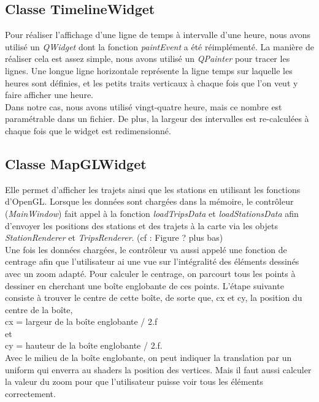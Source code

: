 \documentclass[12pt]{article}
\begin{document}
		\subsection{Classe TimelineWidget}
		Pour réaliser l’affichage d’une ligne de temps à intervalle d’une heure, nous avons utilisé un \textit{QWidget} dont la fonction \textit{paintEvent} a été réimplémenté. La manière de réaliser cela est assez simple, nous avons utilisé un \textit{QPainter} pour tracer les lignes. Une longue ligne horizontale représente la ligne temps sur laquelle les heures sont définies, et les petits traits verticaux à chaque fois que l’on veut y faire afficher une heure.\\
Dans notre cas, nous avons utilisé vingt-quatre heure, mais ce nombre est paramétrable dans un fichier. De plus, la largeur des intervalles est re-calculées à  chaque fois que le widget est redimensionné.				
		
		\subsection{Classe MapGLWidget}
		Elle permet d’afficher les trajets ainsi que les stations en utilisant les fonctions d’OpenGL. Lorsque les données sont chargées dans la mémoire, le contrôleur (\textit{MainWindow}) fait appel à la fonction \textit{loadTripsData} et \textit{loadStationsData} afin d’envoyer les positions des stations et des trajets à la carte via les objets \textit{StationRenderer} et \textit{TripsRenderer}. (cf : Figure ? plus bas)\\

		Une fois les données chargées, le contrôleur va aussi appelé une fonction de centrage afin que l’utilisateur ai une vue sur l’intégralité des éléments dessinés avec un zoom adapté.
Pour calculer le centrage, on parcourt tous les points à dessiner en cherchant une boîte englobante de ces points. L’étape suivante consiste à trouver le centre de cette boîte, de sorte que, cx et cy, la position du centre de la boîte,\\
cx = largeur de la boîte englobante / 2.f \\
et\\
cy = hauteur de la boîte englobante  / 2.f.\\

	Avec le milieu de la boîte englobante, on peut indiquer la translation par un uniform qui enverra au shaders la position des vertices. Mais il faut aussi calculer la valeur du zoom pour que l’utilisateur puisse voir tous les éléments correctement.\\
\end{document}
